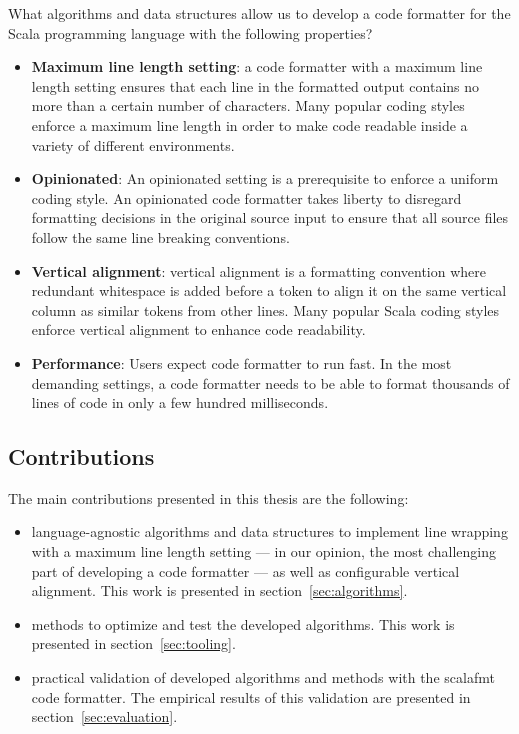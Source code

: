 What algorithms and data structures allow us to develop a code formatter for the Scala programming language with the following properties?
\begin{itemize}
  \item \textbf{Maximum line length setting}: a code formatter with a maximum line length setting ensures that each line in the formatted output contains no more than a certain number of characters.
    Many popular coding styles enforce a maximum line length in order to make code readable inside a variety of different environments.
  \item \textbf{Opinionated}:
    An opinionated setting is a prerequisite to enforce a uniform coding style.
    An opinionated code formatter takes liberty to disregard formatting decisions in the original source input to ensure that all source files follow the same line breaking conventions.
  \item \textbf{Vertical alignment}: vertical alignment is a formatting convention where redundant whitespace is added before a token to align it on the same vertical column as similar tokens from other lines. Many popular Scala coding styles enforce vertical alignment to enhance code readability.
  \item \textbf{Performance}: Users expect code formatter to run fast.
    In the most demanding settings, a code formatter needs to be able to format thousands of lines of code in only a few hundred milliseconds.

\end{itemize}

\subsection{Contributions}
The main contributions presented in this thesis are the following:
\begin{itemize}
  \item language-agnostic algorithms and data structures to implement line
    wrapping with a maximum line length setting --- in our opinion, the most
    challenging part of developing a code formatter --- as well as configurable
    vertical alignment.
    This work is presented in section~\ref{sec:algorithms}.
  \item methods to optimize and test the developed algorithms.
    This work is presented in section~\ref{sec:tooling}.
  \item practical validation of developed algorithms and methods with the scalafmt code formatter.
    The empirical results of this validation are presented in section~\ref{sec:evaluation}.
\end{itemize}
